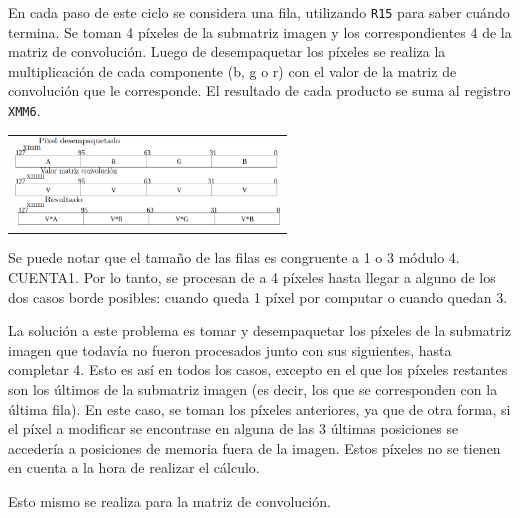         En cada paso de este ciclo se considera una fila, utilizando \texttt{R15} para saber cuándo termina. Se toman 4 píxeles de la submatriz imagen y los correspondientes 4 de la matriz de convolución. Luego de desempaquetar los píxeles se realiza la multiplicación de cada componente (\textsf{b}, \textsf{g} o \textsf{r}) con el valor de la matriz de convolución que le corresponde. El resultado de cada producto se suma al registro \texttt{XMM6}. 

        {\centering \begin{tabular}{c}
          \includegraphics[width=7cm]{./imagenes/3bis.png} \\
        \end{tabular}}

        Se puede notar que el tamaño de las filas es congruente a 1 o 3 módulo 4. 
        CUENTA1. Por lo tanto, se procesan de a 4 píxeles hasta llegar a alguno de los dos casos borde posibles: cuando queda 1 píxel por computar o cuando quedan 3. 
        
        La solución a este problema es tomar y desempaquetar los píxeles de la submatriz imagen que todavía no fueron procesados junto con sus siguientes, hasta completar 4. Esto es así en todos los casos, excepto en el que los píxeles restantes son los últimos de la submatriz imagen (es decir, los que se corresponden con la última fila). En este caso, se toman los píxeles anteriores, ya que de otra forma, si el píxel a modificar se encontrase en alguna de las 3 últimas posiciones se accedería a posiciones de memoria fuera de la imagen. Estos píxeles no se tienen en cuenta a la hora de realizar el cálculo.

        Esto mismo se realiza para la matriz de convolución.
          
